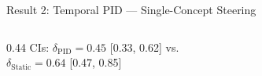 \documentclass[aspectratio=169, 11pt]{beamer}
\begin{document}
\begin{frame}{Result 2: Temporal PID --- Single-Concept Steering}
\begin{columns}[T]
\begin{column}{0.44\textwidth}
\vspace{0.3em}
{\footnotesize\color{gray} CIs: $\delta_\text{PID} = 0.45$ [0.33, 0.62] vs.\\ $\delta_\text{Static} = 0.64$ [0.47, 0.85]}
\end{column}
\end{columns}

\end{frame}
\end{document}
